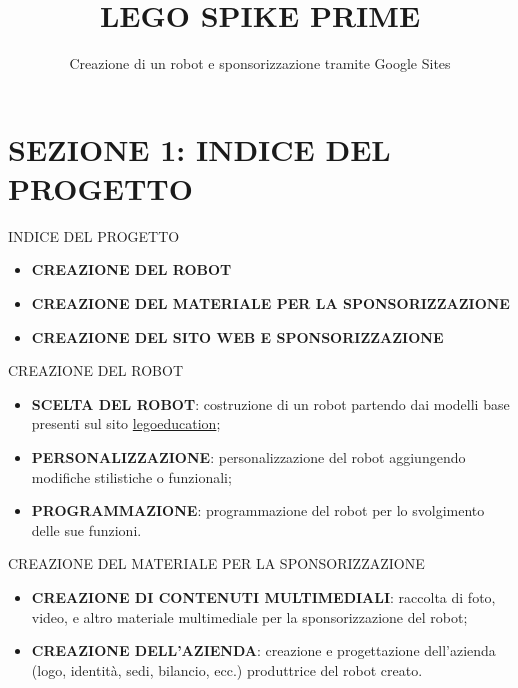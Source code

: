 \documentclass[aspectratio=1610]{beamer}
\title{LEGO SPIKE PRIME}
\subtitle{Creazione di un robot e sponsorizzazione tramite Google Sites}
\date{}
\begin{document}
\begin{frame}
    \titlepage
\end{frame}

\section{SEZIONE 1: INDICE DEL PROGETTO}

\begin{frame}{INDICE DEL PROGETTO}
    \begin{itemize}
        \item \textbf{CREAZIONE DEL ROBOT}
        \pause
        \item \textbf{CREAZIONE DEL MATERIALE PER LA SPONSORIZZAZIONE}
        \pause
        \item \textbf{CREAZIONE DEL SITO WEB E SPONSORIZZAZIONE}
    \end{itemize}
\end{frame}

\begin{frame}{CREAZIONE DEL ROBOT}
    \begin{itemize}
        \item \textbf{SCELTA DEL ROBOT}: costruzione di un robot partendo dai modelli base
        presenti sul sito \href{https://spike.legoeducation.com/prime/models/}{legoeducation};
        \pause
        \item \textbf{PERSONALIZZAZIONE}: personalizzazione del robot aggiungendo modifiche stilistiche 
        o funzionali;
        \pause
        \item \textbf{PROGRAMMAZIONE}: programmazione del robot per lo svolgimento delle sue funzioni.
    \end{itemize}
\end{frame}

\begin{frame}{CREAZIONE DEL MATERIALE PER LA SPONSORIZZAZIONE}
    \begin{itemize}
        \item \textbf{CREAZIONE DI CONTENUTI MULTIMEDIALI}: raccolta di foto, video, e altro materiale 
        multimediale per la sponsorizzazione del robot; 
        \pause
        \item \textbf{CREAZIONE DELL'AZIENDA}: creazione e progettazione dell'azienda (logo, identità, sedi, bilancio, ecc.) 
        produttrice del robot creato.
    \end{itemize}
\end{frame}
\end{document}
